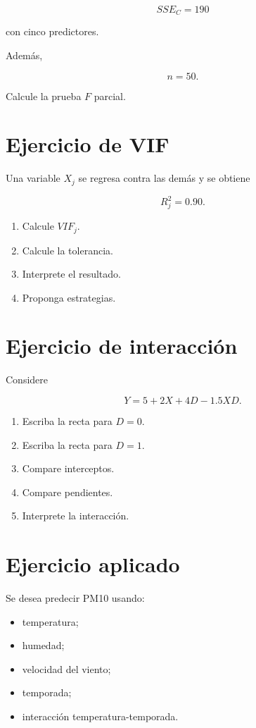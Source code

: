 \documentclass[
  spanish,
  11pt,
  letterpaper,
  DIV=11,
  numbers=noendperiod]{scrreprt}
\providecommand{\tightlist}{%
  \setlength{\itemsep}{0pt}\setlength{\parskip}{0pt}}
\theoremstyle{definition}
\theoremstyle{plain}
\theoremstyle{definition}
\theoremstyle{remark}
\begin{document}
\[
SSE_C=190
\]

con cinco predictores.

Además,

\[
n=50.
\]

Calcule la prueba \(F\) parcial.

\section{Ejercicio de VIF}\label{ejercicio-de-vif}

Una variable \(X_j\) se regresa contra las demás y se obtiene

\[
R_j^2=0.90.
\]

\begin{enumerate}
\def\labelenumi{\arabic{enumi}.}
\tightlist
\item
  Calcule \(VIF_j\).
\item
  Calcule la tolerancia.
\item
  Interprete el resultado.
\item
  Proponga estrategias.
\end{enumerate}

\section{Ejercicio de interacción}\label{ejercicio-de-interacciuxf3n}

Considere

\[
Y
=
5
+
2X
+
4D
-
1.5XD.
\]

\begin{enumerate}
\def\labelenumi{\arabic{enumi}.}
\tightlist
\item
  Escriba la recta para \(D=0\).
\item
  Escriba la recta para \(D=1\).
\item
  Compare interceptos.
\item
  Compare pendientes.
\item
  Interprete la interacción.
\end{enumerate}

\section{Ejercicio aplicado}\label{ejercicio-aplicado-7}

Se desea predecir PM10 usando:

\begin{itemize}
\tightlist
\item
  temperatura;
\item
  humedad;
\item
  velocidad del viento;
\item
  temporada;
\item
  interacción temperatura-temporada.
\end{itemize}
\end{document}
